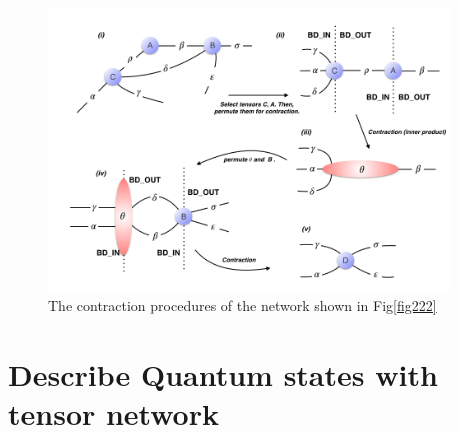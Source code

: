 \begin{figure}[ht]
	\centering
	\includegraphics[width=0.95\textwidth]{figures/fig223.png}
	\caption[The contraction procedures of the network shown in Fig\ref{fig222}(ii)]{ The contraction procedures of the network shown in Fig\ref{fig222}}
	\label{fig223}
\end{figure}


\section{Describe Quantum states with tensor network} %
\label{sub:map2quan}

